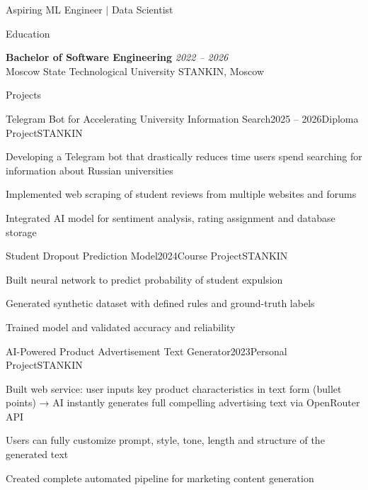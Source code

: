\documentclass[11pt]{resume}
\begin{document}
{\centering\LARGE Aspiring ML Engineer $|$ Data Scientist\par}
\vspace{0.8em}

\begin{rSection}{Education}

\textbf{Bachelor of Software Engineering} \hfill \textit{2022 -- 2026}\\
Moscow State Technological University STANKIN, Moscow

\end{rSection}

\begin{rSection}{Projects}

\begin{rSubsection}{Telegram Bot for Accelerating University Information Search}{2025 -- 2026}{Diploma Project}{STANKIN}
	\item Developing a Telegram bot that drastically reduces time users spend searching for information about Russian universities
	\item Implemented web scraping of student reviews from multiple websites and forums
	\item Integrated AI model for sentiment analysis, rating assignment and database storage
\end{rSubsection}

\begin{rSubsection}{Student Dropout Prediction Model}{2024}{Course Project}{STANKIN}
	\item Built neural network to predict probability of student expulsion
	\item Generated synthetic dataset with defined rules and ground-truth labels
	\item Trained model and validated accuracy and reliability
\end{rSubsection}

\begin{rSubsection}{AI-Powered Product Advertisement Text Generator}{2023}{Personal Project}{STANKIN}
	\item Built web service: user inputs key product characteristics in text form (bullet points) → AI instantly generates full compelling advertising text via OpenRouter API
	\item Users can fully customize prompt, style, tone, length and structure of the generated text
	\item Created complete automated pipeline for marketing content generation
\end{rSubsection}

\end{rSection}
\end{document}
